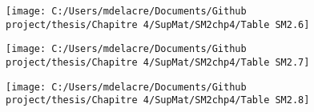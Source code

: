 \documentclass[
  english,
  man,mask,floatsintext]{apa6}
\begin{document}
\begin{landscape}
\newpage

\begin{figure}

{\centering \texttt{[image: C:/Users/mdelacre/Documents/Github project/thesis/Chapitre 4/SupMat/SM2chp4/Table SM2.6]} 

}

\end{figure}

\end{landscape}
\begin{landscape}
\newpage

\begin{figure}

{\centering \texttt{[image: C:/Users/mdelacre/Documents/Github project/thesis/Chapitre 4/SupMat/SM2chp4/Table SM2.7]} 

}

\end{figure}

\end{landscape}
\begin{landscape}
\newpage

\begin{figure}

{\centering \texttt{[image: C:/Users/mdelacre/Documents/Github project/thesis/Chapitre 4/SupMat/SM2chp4/Table SM2.8]} 

}

\end{figure}

\end{landscape}
\end{document}
